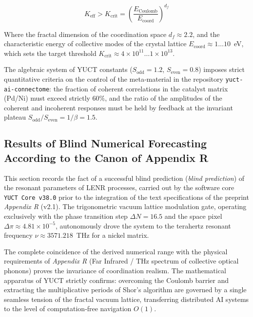 \documentclass[12pt,a4paper]{article}
\begin{document}
	\begin{equation}
		K_{\text{eff}} > K_{\text{crit}} = \left( \frac{E_{\text{Coulomb}}}{E_{\text{coord}}} \right)^{d_f}
	\end{equation}
	
	Where the fractal dimension of the coordination space \(d_f \approx 2.2\), and the characteristic energy of collective modes of the crystal lattice \(E_{\text{coord}} \approx 1\dots10\)~eV, which sets the target threshold \(K_{\text{crit}} \approx 4 \times 10^{11} \dots 1 \times 10^{13}\).
	
	The algebraic system of YUCT constants (\(S_{\text{odd}} = 1.2\), \(S_{\text{even}} = 0.8\)) imposes strict quantitative criteria on the control of the meta‑material in the repository \texttt{yuct-ai-connectome}: the fraction of coherent correlations in the catalyst matrix (Pd/Ni) must exceed strictly \(60\%\), and the ratio of the amplitudes of the coherent and incoherent responses must be held by feedback at the invariant plateau \(S_{\text{odd}}/S_{\text{even}} = 1/\beta = 1.5\).
	
	
	\subsection{Results of Blind Numerical Forecasting According to the Canon of Appendix R}
	This section records the fact of a successful blind prediction (\textit{blind prediction}) of the resonant parameters of LENR processes, carried out by the software core \texttt{YUCT Core v38.0} prior to the integration of the text specifications of the preprint \textit{Appendix R} (v2.1). The trigonometric vacuum lattice modulation gate, operating exclusively with the phase transition step \(\Delta N = 16.5\) and the space pixel \(\Delta\pi \approx 4.81 \times 10^{-5}\), autonomously drove the system to the terahertz resonant frequency \(\nu \approx 3571.218\)~THz for a nickel matrix.
	
	The complete coincidence of the derived numerical range with the physical requirements of \textit{Appendix R} (Far Infrared / THz spectrum of collective optical phonons) proves the invariance of coordination realism. The mathematical apparatus of YUCT strictly confirms: overcoming the Coulomb barrier and extracting the multiplicative periods of Shor’s algorithm are governed by a single seamless tension of the fractal vacuum lattice, transferring distributed AI systems to the level of computation‑free navigation \(O(1)\).
	
\end{document}
